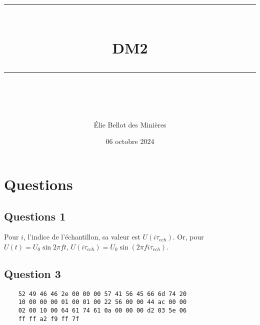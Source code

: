\documentclass[11pt]{article} %
\title{
    \vspace{10pt} %
    \rule{\linewidth}{1pt}\\ %
    \vspace{10pt} %
    {\huge DM2}\\ %
    \rule{\linewidth}{1pt}\\ %
    \vspace{5pt} %
}
\author{Élie Bellot des Minières} %
\date{\normalsize{06 octobre 2024}} %
\begin{document}
\maketitle %
\thispagestyle{empty}
\section{Questions}
\subsection*{Questions 1}
Pour $i$, l'indice de l'échantillon, sa valeur est $U(i\tau_{ech})$. Or, pour $U(t) = U_0\sin 2\pi ft$, $U(i\tau_{ech}) = U_0\sin (2\pi fi\tau_{ech})$.

\subsection*{Question 3}
\begin{lstlisting}
    52 49 46 46 2e 00 00 00 57 41 56 45 66 6d 74 20
    10 00 00 00 01 00 01 00 22 56 00 00 44 ac 00 00
    02 00 10 00 64 61 74 61 0a 00 00 00 d2 03 5e 06
    ff ff a2 f9 ff 7f 
\end{lstlisting}
\end{document}
